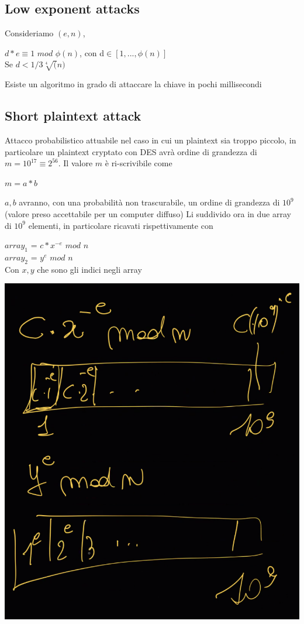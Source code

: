 \documentclass[11pt, oneside]{article}   	%
\begin{document}
\subsection*{Low exponent attacks}
Consideriamo $(e,n)$, \begin{center}
$d* e \equiv 1$ $mod$ $\phi(n)$, con d$\in [1, ..., \phi(n)]$\\
Se $d < 1/3\sqrt[4](n)$
\end{center} 
Esiste un algoritmo in grado di attaccare la chiave in pochi millisecondi
\subsection*{Short plaintext attack}
Attacco probabilistico attuabile nel caso in cui un plaintext sia troppo piccolo, in particolare un plaintext cryptato con DES avrà ordine di grandezza di $m = 10^{17} \equiv 2^{56}$. Il valore $m$ è ri-scrivibile come \begin{center}
$m = a*b$
\end{center}
$a,b$ avranno, con una probabilità non trascurabile, un ordine di grandezza di $10^9$ (valore preso accettabile per un computer diffuso)
Li suddivido ora in due array di $10^9$ elementi, in particolare ricavati rispettivamente con
\begin{center}
$array_1$ = $c*x^{-e}$ $mod$ $n$\\
$array_2$ = $y^e$ $mod$ $n$\\
Con $x, y$ che sono gli indici negli array
\end{center}
\begin{center}
\includegraphics[scale= 0.7]{m1}
\end{center}
\end{document}
